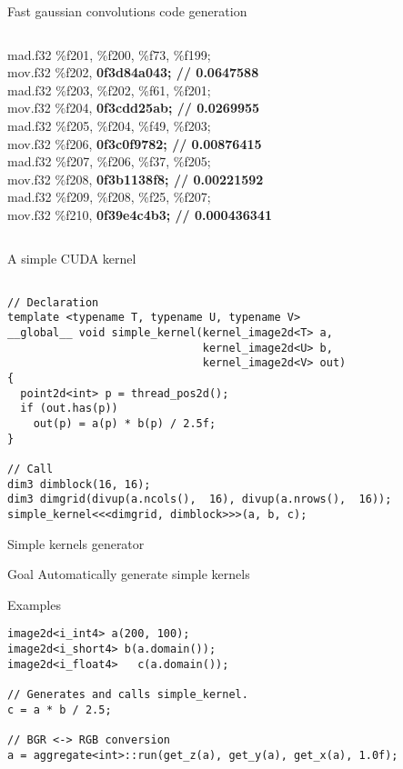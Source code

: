 \documentclass{beamer}
\begin{document}
\begin{frame}[containsverbatim]{Fast gaussian convolutions code generation}
\begin{columns}
\begin{column}[r]{5cm}
{mad.f32 	\%f201, \%f200, \%f73, \%f199;\\
mov.f32 	\%f202, \textbf{0f3d84a043;   	// 0.0647588} \\
mad.f32 	\%f203, \%f202, \%f61, \%f201;\\
mov.f32 	\%f204, \textbf{0f3cdd25ab;   	// 0.0269955} \\
mad.f32 	\%f205, \%f204, \%f49, \%f203;\\
mov.f32 	\%f206, \textbf{0f3c0f9782;   	// 0.00876415} \\
mad.f32 	\%f207, \%f206, \%f37, \%f205;\\
mov.f32 	\%f208, \textbf{0f3b1138f8;   	// 0.00221592} \\
mad.f32 	\%f209, \%f208, \%f25, \%f207;\\
mov.f32 	\%f210, \textbf{0f39e4c4b3;   	// 0.000436341}}
\end{column}
\end{columns}

\end{frame}

\begin{frame}[containsverbatim]{A simple CUDA kernel}

\begin{lstlisting}

// Declaration
template <typename T, typename U, typename V>
__global__ void simple_kernel(kernel_image2d<T> a,
                              kernel_image2d<U> b,
                              kernel_image2d<V> out)
{
  point2d<int> p = thread_pos2d();
  if (out.has(p))
    out(p) = a(p) * b(p) / 2.5f;
}

// Call
dim3 dimblock(16, 16);
dim3 dimgrid(divup(a.ncols(),  16), divup(a.nrows(),  16));
simple_kernel<<<dimgrid, dimblock>>>(a, b, c);
\end{lstlisting}

\end{frame}

\begin{frame}[containsverbatim]{Simple kernels generator}

  \begin{block}{Goal}
  Automatically generate simple kernels
  \end{block}

\begin{block}{Examples}
\begin{lstlisting}
image2d<i_int4> a(200, 100);
image2d<i_short4> b(a.domain());
image2d<i_float4>   c(a.domain());

// Generates and calls simple_kernel.
c = a * b / 2.5;

// BGR <-> RGB conversion
a = aggregate<int>::run(get_z(a), get_y(a), get_x(a), 1.0f);
\end{lstlisting}
\end{block}
\end{frame}
\end{document}
